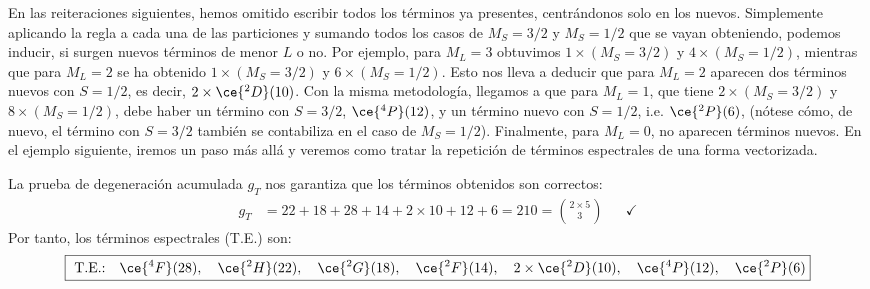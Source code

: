 En las reiteraciones siguientes, hemos omitido escribir todos los términos ya presentes, centrándonos solo en los nuevos. Simplemente aplicando la regla a cada una de las particiones y sumando todos los casos de $M_{S}=3/2$ y $M_{S} = 1/2$ que se vayan obteniendo, podemos inducir, si surgen nuevos términos de menor $L$ o no. Por ejemplo, para $M_{L} = 3$ obtuvimos $1 \times (M_{S} = 3/2)$ y $4 \times (M_{S} = 1/2)$, mientras que para $M_{L} = 2$  se ha obtenido $1 \times (M_{S} = 3/2)$ y $6 \times (M_{S} = 1/2)$. Esto nos lleva a deducir que para $M_{L} = 2$ aparecen dos términos nuevos con $S = 1/2$, es decir, $2 \times \ce{^{2}D}(10)$. Con la misma metodología, llegamos a que para $M_{L} =1$, que tiene $2 \times (M_{S} = 3/2)$  y $8 \times (M_{S} = 1/2)$, debe haber un término con $S = 3/2$, $\ce{^{4}P}(12)$, y un término nuevo con $S = 1/2$, i.e. $\ce{^{2}P}(6)$, (nótese cómo, de nuevo, el término con $S = 3/2$ también se contabiliza en el caso de $M_{S} = 1/2$). Finalmente, para $M_{L} = 0$, no aparecen términos nuevos. En el ejemplo siguiente, iremos un paso más allá y veremos como tratar la repetición de términos espectrales de una forma vectorizada. 


La prueba de degeneración acumulada $g_{T}$ nos garantiza que los términos obtenidos son correctos: 
\begin{align*}
  g_{T} &= 22 + 18 + 28 + 14 + 2 \times 10 + 12 + 6 = 210 = \binom{2 \times 5}{3} & &\boxed{\checkmark}
\end{align*}
Por tanto, los términos espectrales (T.E.) son: 
\begin{align*}
  \boxed{\text{ T.E.:} \quad \ce{^{4}F}(28), \quad \ce{^{2}H}(22), \quad \ce{^{2}G}(18), \quad \ce{^{2}F}(14), \quad 2 \times \ce{^{2}D}(10), \quad \ce{^{4}P}(12), \quad \ce{^{2}P}(6)}
\end{align*}

